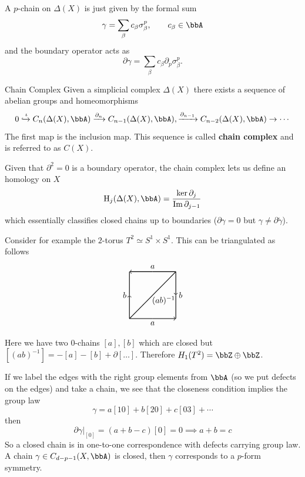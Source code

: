 \documentclass[11pt]{article}
\theoremstyle{definition}
\numberwithin{equation}{section}
\newcommand\HH{\mathrm{H}}
\begin{document}
A $p$-chain on $\Delta(X)$ is just given by the formal sum
\begin{equation}
	 \gamma=\sum_{\beta}c_{\beta}\sigma^{p}_{\beta},\qquad c_{\beta}\in\bbA
\end{equation}
and the boundary operator acts as
\begin{equation}
	\partial \gamma=\sum_{\beta}c_{\beta}\partial_{p}\sigma_{\beta}^{p}.
\end{equation}
\begin{defn}{Chain Complex}{}
	Given a simplicial complex $\Delta(X)$ there exists a sequence of abelian groups and homeomorphisms
	\begin{equation}
		0\xhookrightarrow{\iota} C_{n}(\Delta(X),\bbA)\xrightarrow{\partial_{n}} C_{n-1}(\Delta(X),\bbA),\xrightarrow{\partial_{n-1}}C_{n-2}(\Delta(X),\bbA)\rightarrow\cdots
	\end{equation}
	The first map is the inclusion map. This sequence is called \textbf{chain complex} and is referred to as $C(X)$.
\end{defn}
Given that $\partial^{2}=0$ is a boundary operator, the chain complex lets us define an homology on $X$
\begin{equation}
	\HH_{j}(\Delta(X),\bbA)=\frac{\ker \partial_{j}}{\Im \partial_{j-1}}
\end{equation}
which essentially classifies closed chains up to boundaries ($\partial\gamma=0$ but $\gamma\neq\partial\tilde\gamma$).

Consider for example the $2$-torus $T^{2}\simeq S^{1}\times S^{1}$. This can be triangulated as follows
\begin{equation}
\begin{tikzpicture}[thick]
  \draw[->](0,0)--(0,1) node[anchor=east] {$b$};
  \draw[-](0,1)--(0,2);
  \draw[<-](0,2)--(1,2) node[anchor=south] {$a$};
  \draw[-](1,2)--(2,2);
  \draw[->](2,2)--(2,1)node[anchor=west] {$b$};
  \draw[-](2,1)--(2,0);
  \draw[<-](2,0)--(1,0) node[anchor=north] {$a$};
  \draw[-](1,0)--(0,0);
  \draw[-](0,0)--(2,2) node[yshift=-35, xshift=-15] {$\tiny (ab)^{-1}$};
\end{tikzpicture}
\end{equation}
Here we have two $0$-chains $[a],[b]$ which are closed but $[(ab)^{-1}]=-[a]-[b]+\partial[\ldots]$. Therefore $H_{1}(T^{2})=\bbZ\oplus\bbZ$.

If we label the edges with the right group elements from $\bbA$ (so we put defects on the edges) and take a chain, we see that the closeness condition implies the group law
\begin{equation}
	\gamma=a[10]+b[20]+c[03]+\cdots
\end{equation}
then
\begin{equation}
	\left.\partial\gamma\right|_{[0]}=(a+b-c)[0]=0\implies a+b=c
\end{equation}
So a closed chain is in one-to-one correspondence with defects carrying group law. A chain $\gamma\in C_{d-p-1}(X,\bbA)$ is closed, then $\gamma$ corresponds to a $p$-form symmetry.
\end{document}
